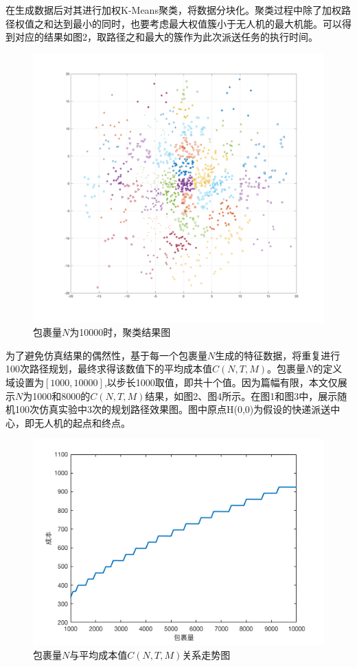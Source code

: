 \documentclass[twocolumn]{jbuaa}
\begin{document}
	在生成数据后对其进行加权K-Means聚类，将数据分块化。聚类过程中除了加权路径权值之和达到最小的同时，也要考虑最大权值簇小于无人机的最大机能。可以得到对应的结果如图2，取路径之和最大的簇作为此次派送任务的执行时间。

	\begin{figure}
		\centering
		\includegraphics[scale=0.11]{Figs/uavAfter.png}
		\caption{包裹量$N$为10000时，聚类结果图}
		\label{fig:02}
	\end{figure}



	为了避免仿真结果的偶然性，基于每一个包裹量$N$生成的特征数据，将重复进行100次路径规划，最终求得该数值下的平均成本值$C(N,T,M)$。包裹量$N$的定义域设置为$[1000,10000]$,以步长1000取值，即共十个值。因为篇幅有限，本文仅展示$N$为1000和8000的$C(N,T,M)$结果，如图2、图4所示。在图1和图3中，展示随机100次仿真实验中3次的规划路径效果图。图中原点H(0,0)为假设的快递派送中心，即无人机的起点和终点。

	\begin{figure}[!h]
	\centering
	\includegraphics[scale=0.4]{Figs/uavResult.png}
	\caption{包裹量$N$与平均成本值$C(N,T,M)$关系走势图}
	\label{fig:06}
	\end{figure}
\end{document}
